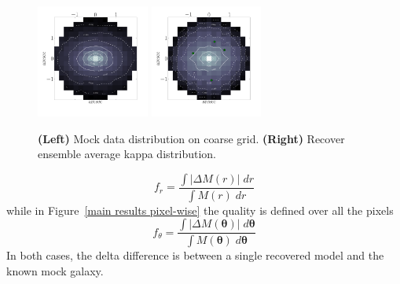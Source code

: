 \documentclass[galley,usenatbib]{mn2e}
\newcommand{\M}{\ensuremath{\mathscr{M}}}
\newcommand{\figref}[1] {Figure~\ref{#1}}
\renewcommand{\vec}[1]{\ensuremath{\boldsymbol{#1}}}
\begin{document}
\begin{figure}
\includegraphics[width=0.33\textwidth]{BCQuadR1a_TmS-kappa-a.pdf}
\includegraphics[width=0.33\textwidth]{BCQuadR1a_TmS-kappa-b.pdf}
\caption{ {\bf (Left)} Mock data distribution on coarse grid. {\bf (Right)} Recover ensemble average kappa distribution.}
\label{2d mass reconstruction}
\end{figure}

%
\begin{equation} \label{badness}
  f_r = \frac {\int \left|\Delta M(r)\right|\; dr } {\int M(r)\; dr}
\end{equation}
%
while in \figref{main results pixel-wise} the quality is defined over all the pixels
%
\begin{equation} \label{badness}
f_\theta = \frac
       {\int \left|\Delta M(\vec\theta)\right| \; d \vec{\theta} }
       {\int M(\vec\theta) \; d \vec\theta}
\end{equation}
In both cases, the delta difference is between a single recovered model and the known mock galaxy.
\end{document}
